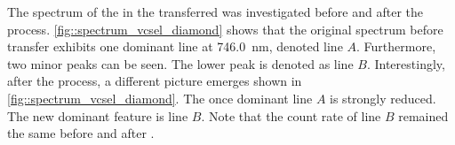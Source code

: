 	The spectrum of the \siv in the transferred \nd was investigated before and after the \pp process. \autoref{fig::spectrum_vcsel_diamond} shows that the original spectrum before \nd transfer exhibits one dominant line at \SI{746.0}{nm}, denoted line $A$. Furthermore, two minor peaks can be seen. The lower \wl peak is denoted as line $B$. Interestingly, after the \pp process, a different picture emerges shown in \autoref{fig::spectrum_vcsel_diamond}. The once dominant line $A$ is strongly reduced. The new dominant feature is line $B$. Note that the count rate of line $B$ remained the same before and after \pp.


	\begin{figure}[htp]
		\begin{subfigure}[t]{ 0.49\linewidth}
			\centering
			\caption{}
			\label{subfig::spectrum_diamond_for_vcsel_before_pp}
		\end{subfigure}
		\hfill
		\begin{subfigure}[t]{ 0.49\linewidth}
			\centering

\end{subfigure}
\end{figure}
